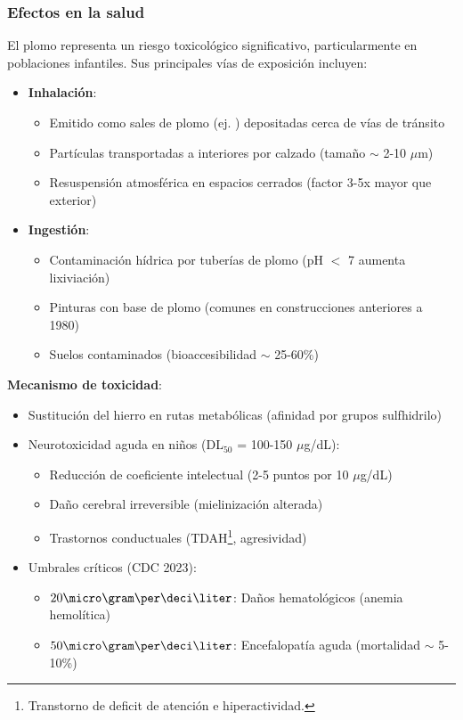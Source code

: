 \subsubsection{Efectos en la salud} El plomo representa un riesgo toxicol\'{o}gico significativo, particularmente en poblaciones infantiles. Sus principales v\'{i}as de exposici\'{o}n incluyen:

\begin{itemize}
    \item \textbf{Inhalaci\'{o}n}: 
    \begin{itemize}
        \item Emitido como sales de plomo (ej. ) depositadas cerca de v\'{i}as de tr\'{a}nsito
        \item Part\'{i}culas transportadas a interiores por calzado (tama\~no $\sim$ 2-10 $\mu$m)
        \item Resuspensi\'{o}n atmosf\'{e}rica en espacios cerrados (factor 3-5x mayor que exterior)
    \end{itemize}
    
    \item \textbf{Ingesti\'{o}n}:
    \begin{itemize}
        \item Contaminaci\'{o}n h\'{i}drica por tuber\'{i}as de plomo (pH $<$ 7 aumenta lixiviaci\'{o}n)
        \item Pinturas con base de plomo (comunes en construcciones anteriores a 1980)
        \item Suelos contaminados (bioaccesibilidad $\sim$ 25-60\%)
    \end{itemize}
\end{itemize}

\textbf{Mecanismo de toxicidad}:
\begin{itemize}
    \item Sustituci\'{o}n del hierro en rutas metab\'{o}licas (afinidad por grupos sulfhidrilo)
    \item Neurotoxicidad aguda en ni\~nos (DL$_{50}$ = 100-150 $\mu$g/dL):
    \begin{itemize}
        \item Reducci\'{o}n de coeficiente intelectual (2-5 puntos por 10 $\mu$g/dL)
        \item Da\~no cerebral irreversible (mielinizaci\'{o}n alterada)
        \item Trastornos conductuales (TDAH\footnote{Transtorno de deficit de atención e hiperactividad.}, agresividad)
    \end{itemize}
    
    \item Umbrales cr\'{i}ticos (CDC 2023):
    \begin{itemize}
        \item $20\micro\gram\per\deci\liter$: Da\~nos hematol\'{o}gicos (anemia hemol\'{i}tica)
        \item $50 \micro\gram\per\deci\liter$: Encefalopat\'{i}a aguda (mortalidad $\sim$ 5-10\%)
    \end{itemize}
\end{itemize}


